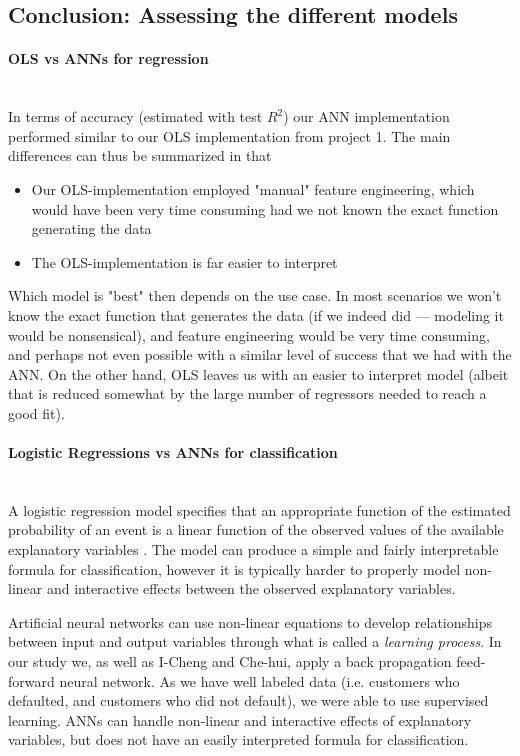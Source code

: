 \documentclass[10pt, a4paper, twocolumn]{article}
\newcommand{\myparagraph}[1]{\paragraph{#1}\mbox{}\\}
\begin{document}
	\subsection{Conclusion: Assessing the different models}
		\myparagraph{OLS vs ANNs for regression}
			In terms of accuracy (estimated with test $R^2$) our ANN implementation performed similar to our OLS implementation from project 1\cite{Project1}. The main differences can thus be summarized in that 
			\begin{itemize}
				\item Our OLS-implementation employed "manual" feature engineering, which would have been very time consuming had we not known the exact function generating the data
				\item The OLS-implementation is far easier to interpret
			\end{itemize}
			Which model is "best" then depends on the use case. In most scenarios we won't know the exact function that generates the data (if we indeed did --- modeling it would be nonsensical), and feature engineering would be very time consuming, and perhaps not even possible with a similar level of success that we had with the ANN. On the other hand, OLS leaves us with an easier to interpret model (albeit that is reduced somewhat by the large number of regressors needed to reach a good fit).
			
		\myparagraph{Logistic Regressions vs ANNs for classification}
		
		
		A logistic regression model specifies that an appropriate function of the estimated probability of an event is a linear function of the observed values of the available explanatory variables \cite{ScientificArticle}. The model can produce a simple and fairly interpretable formula for classification, however it is typically harder to properly model non-linear and interactive effects between the observed explanatory variables.
		
		Artificial neural networks can use non-linear equations to develop relationships between input and output variables through what is called a \emph{learning process}. In our study we, as well as I-Cheng and Che-hui\cite{ScientificArticle}, apply a back propagation feed-forward neural network. As we have well labeled data (i.e. customers who defaulted, and customers who did not default), we were able to use supervised learning. ANNs can handle non-linear and interactive effects of explanatory variables, but does not have an easily interpreted formula for classification.
		
\end{document}
